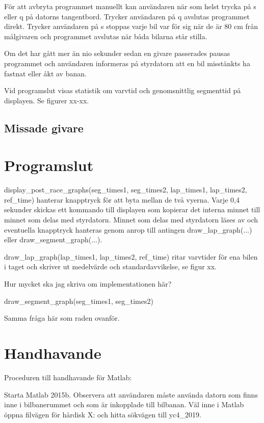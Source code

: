 \documentclass[10pt,oneside,swedish]{lips-no_customer}
\begin{document}
För att avbryta programmet manuellt kan användaren när som helst trycka på s
eller q på datorns tangentbord. Trycker användaren på q avslutas programmet
direkt. Trycker användaren på s stoppas varje bil var för sig när de är 80 cm
från målgivaren och programmet avslutas när båda bilarna står stilla.

Om det har gått mer än nio sekunder sedan en givare passerades pausas programmet
och användaren informeras på styrdatorn att en bil misstänkts ha fastnat eller
åkt av banan. 

Vid programslut visas statistik om varvtid och genomsnittlig segmenttid på
displayen. Se figurer xx-xx.

\subsection{Missade givare}

\section{Programslut}

display\_post\_race\_graphs(seg\_times1, seg\_times2, lap\_times1, lap\_times2,
ref\_time) hanterar knapptryck för att byta mellan de två vyerna. Varje 0,4
sekunder skickas ett kommando till displayen som kopierar det interna minnet
till minnet som delas med styrdatorn. Minnet som delas med styrdatorn läses av
och eventuella knapptryck hanteras genom anrop till antingen
draw\_lap\_graph(...) eller draw\_segment\_graph(...).

draw\_lap\_graph(lap\_times1, lap\_times2, ref\_time) ritar varvtider för
ena bilen i taget och skriver ut medelvärde och standardavvikelse, se figur xx.

Hur mycket ska jag skriva om implementationen här?

draw\_segment\_graph(seg\_times1, seg\_times2)

Samma fråga här som raden ovanför.




\cleardoublepage
\appendix
\section{Handhavande}
Proceduren till handhavande för Matlab:

Starta Matlab 2015b. Observera att användaren måste använda datorn som finns
inne i bilbanerummet och som är inkopplade till bilbanan. Väl inne i Matlab
öppna filvägen för hårdisk X: och hitta sökvägen till yc4\_2019.
\end{document}
